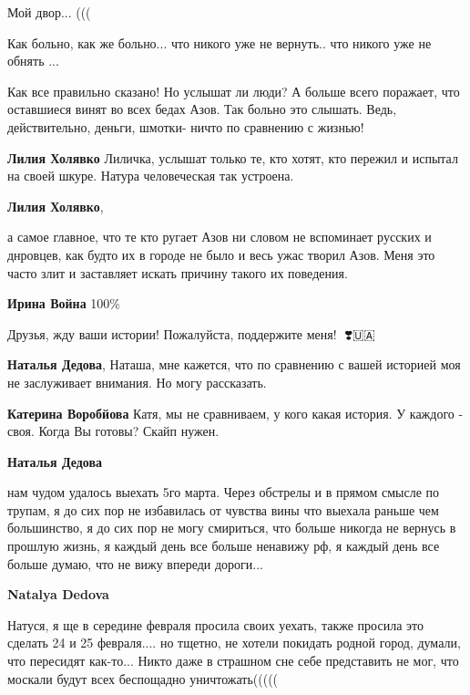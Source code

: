 Мой двор... (((


Как больно, как же больно... что никого уже не вернуть.. что никого уже не обнять ...


Как все правильно сказано! Но услышат ли люди? А больше всего поражает, что
оставшиеся винят во всех бедах Азов. Так больно это слышать. Ведь,
действительно, деньги, шмотки- ничто по сравнению с жизнью!

\begin{itemize} %
\textbf{Лилия Холявко} Лиличка, услышат только те, кто хотят, кто пережил и испытал на своей шкуре. Натура человеческая так устроена.

\textbf{Лилия Холявко}, 

а самое главное, что те кто ругает Азов ни словом не вспоминает русских и
днровцев, как будто их в городе не было и весь ужас творил Азов. Меня это часто
злит и заставляет искать причину такого их поведения.

\textbf{Ирина Война} 100\%
\end{itemize} %


Друзья, жду ваши истории! Пожалуйста, поддержите меня! 🙏❣️🇺🇦

\begin{itemize} %
\textbf{Наталья Дедова}, Наташа, мне кажется, что по сравнению с вашей историей моя не заслуживает внимания. Но могу рассказать.

\textbf{Катерина Воробйова} Катя, мы не сравниваем, у кого какая история. У каждого - своя. Когда Вы готовы?
Скайп нужен.

\textbf{Наталья Дедова} 

нам чудом удалось выехать 5го марта. Через обстрелы и в прямом смысле по
трупам, я до сих пор не избавилась от чувства вины что выехала раньше чем
большинство, я до сих пор не могу смириться, что больше никогда не вернусь в
прошлую жизнь, я каждый день все больше ненавижу рф, я каждый день все больше
думаю, что не вижу впереди дороги...

\textbf{Natalya Dedova} 

Натуся, я ще в середине февраля просила своих уехать, также просила это сделать
24 и 25 февраля.... но тщетно, не хотели покидать родной город, думали, что
пересидят как-то... Никто даже в страшном сне себе представить не мог, что
москали будут всех беспощадно уничтожать(((((

\end{itemize} %

